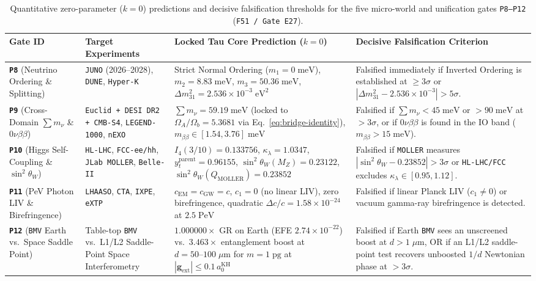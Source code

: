 \documentclass[11pt,a4paper]{article}
\begin{document}
\begin{table}[htbp]
\centering
\caption{Quantitative zero-parameter ($k=0$) predictions and decisive falsification thresholds for the five micro-world and unification gates \texttt{P8--P12} (\texttt{F51 / Gate E27}).}
\label{tab:gates-p8-p12}
\footnotesize
\renewcommand{\arraystretch}{1.22}
\begin{tabularx}{\textwidth}{@{}p{}p{}p{}X@{}}
\toprule
\textbf{Gate ID} & \textbf{Target Experiments} & \textbf{Locked Tau Core Prediction ($k=0$)} & \textbf{Decisive Falsification Criterion} \\
\midrule
\textbf{\texttt{P8}} (Neutrino Ordering \& Splitting) & \texttt{JUNO} (2026--2028), \texttt{DUNE}, \texttt{Hyper-K} & Strict Normal Ordering ($m_1=0\;\mathrm{meV}$), $m_2=8.83\;\mathrm{meV}$, $m_3=50.36\;\mathrm{meV}$, $\Delta m_{31}^2 = 2.536\times 10^{-3}\;\mathrm{eV}^2$ & Falsified immediately if Inverted Ordering is established at $\ge 3\sigma$ or $|\Delta m_{31}^2 - 2.536\times 10^{-3}| > 5\sigma$. \\
\textbf{\texttt{P9}} (Cross-Domain $\sum m_\nu$ \& $0\nu\beta\beta$) & \texttt{Euclid + DESI DR2 + CMB-S4}, \texttt{LEGEND-1000}, \texttt{nEXO} & $\sum m_\nu = 59.19\;\mathrm{meV}$ (locked to $\Omega_A/\Omega_b=5.3681$ via Eq.~\ref{eq:bridge-identity}), $m_{\beta\beta}\in[1.54,3.76]\;\mathrm{meV}$ & Falsified if $\sum m_\nu < 45\;\mathrm{meV}$ or $> 90\;\mathrm{meV}$ at $>3\sigma$, or if $0\nu\beta\beta$ is found in the IO band ($m_{\beta\beta}>15\;\mathrm{meV}$). \\
\textbf{\texttt{P10}} (Higgs Self-Coupling \& $\sin^2\theta_W$) & \texttt{HL-LHC}, \texttt{FCC-ee/hh}, \texttt{JLab MOLLER}, \texttt{Belle-II} & $I_4(3/10)=0.133756$, $\kappa_\lambda = 1.0347$, $y_t^{\mathrm{parent}}=0.96155$, $\sin^2\theta_W(M_Z)=0.23122$, $\sin^2\theta_W(Q_{\mathrm{MOLLER}})=0.23852$ & Falsified if \texttt{MOLLER} measures $|\sin^2\theta_W - 0.23852|>3\sigma$ or \texttt{HL-LHC/FCC} excludes $\kappa_\lambda\in[0.95,1.12]$. \\
\textbf{\texttt{P11}} (PeV Photon LIV \& Birefringence) & \texttt{LHAASO}, \texttt{CTA}, \texttt{IXPE}, \texttt{eXTP} & $c_{\mathrm{EM}}=c_{\mathrm{GW}}=c$, $c_1=0$ (no linear LIV), zero birefringence, quadratic $\Delta c/c = 1.58\times 10^{-24}$ at $2.5\;\mathrm{PeV}$ & Falsified if linear Planck LIV ($c_1\neq 0$) or vacuum gamma-ray birefringence is detected. \\
\textbf{\texttt{P12}} (\texttt{BMV} Earth vs.\ Space Saddle Point) & Table-top \texttt{BMV} vs.\ L1/L2 Saddle-Point Space Interferometry & $1.000000\times$ GR on Earth (EFE $2.74\times 10^{-22}$) vs.\ $\mathbf{3.463\times}$ entanglement boost at $d=50\text{--}100\;\mu\mathrm{m}$ for $m=1\;\mathrm{pg}$ at $|\mathbf{g}_{\mathrm{ext}}|\le 0.1\,a_0^{\mathrm{KH}}$ & Falsified if Earth \texttt{BMV} sees an unscreened boost at $d>1\;\mu\mathrm{m}$, OR if an L1/L2 saddle-point test recovers unboosted $1/d$ Newtonian phase at $>3\sigma$. \\

\end{tabularx}
\end{table}
\end{document}
